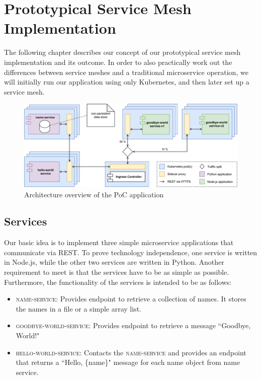 \section{Prototypical Service Mesh Implementation}

The following chapter describes our concept of our prototypical service mesh implementation and its outcome. In order to also practically work out the differences between service meshes and a traditional microservice operation, we will initially run our application using only Kubernetes, and then later set up a service mesh.

\begin{figure}
    \centering
    \includegraphics[width=\textwidth]{img/diagram-draft.pdf}
    \caption{Architecture overview of the PoC application}
    \label{fig:poc-overview}
\end{figure}

\subsection{Services}
\label{sec:services}

Our basic idea is to implement three simple microservice applications that communicate via REST. To prove technology independence, one service is written in Node.js, while the other two services are written in Python. Another requirement to meet is that the services have to be as simple as possible. Furthermore, the functionality of the services is intended to be as follows:

\begin{itemize}
\item \textsc{name-service}: Provides endpoint to retrieve a collection of names. It stores the names in a file or a simple array list.
\item \textsc{goodbye-world-service}: Provides endpoint to retrieve a message ``Goodbye, World!"
\item \textsc{hello-world-service}: Contacts the \textsc{name-service} and provides an endpoint that returns a ``Hello, \{name\}" message for each name object from name service.
\end{itemize}

